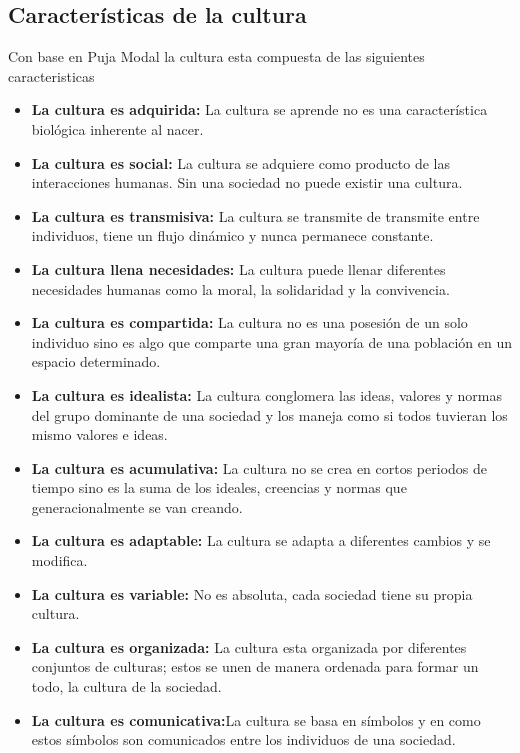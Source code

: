 	\subsection{Características de la cultura}\label{CulturaCaract}
	Con base en Puja Modal la cultura esta compuesta de las siguientes 
	caracteristicas\cite{RefculturaCarac}
	\begin{itemize}
		\item \textbf{La cultura es adquirida:} La cultura se aprende no es una 
		característica biológica inherente al nacer. 
		\item \textbf{La cultura es social:} La cultura se adquiere como producto de 
		las interacciones humanas. Sin una sociedad no puede existir una cultura.
		\item \textbf{La cultura es transmisiva:} La cultura se transmite de transmite 
		entre individuos, tiene un flujo dinámico y nunca permanece constante.
		\item \textbf{La cultura llena necesidades:} La cultura puede llenar diferentes 
		necesidades humanas como la moral, la solidaridad y la convivencia.
		\item \textbf{La cultura es compartida:} La cultura no es una posesión de un solo 
		individuo sino es algo que comparte una gran mayoría de una población en un espacio 
		determinado.
		\item \textbf{La cultura es idealista:} La cultura conglomera las ideas, 
		valores y normas del grupo dominante de una sociedad y los maneja como si todos 
		tuvieran los mismo valores e ideas. 
		\item \textbf{La cultura es acumulativa:} La cultura no se crea en cortos periodos 
		de tiempo sino es la suma de los ideales, creencias y normas que generacionalmente 
		se van creando.
		\item \textbf{La cultura es adaptable:} La cultura se adapta a diferentes 
		cambios y se modifica.
		\item \textbf{La cultura es variable:} No es absoluta, cada sociedad tiene su 
		propia cultura.
		\item \textbf{La cultura es organizada:} La cultura esta organizada por 
		diferentes conjuntos de culturas; estos se unen de manera ordenada para formar 
		un todo, la cultura de la sociedad. 
		\item \textbf{La cultura es comunicativa:}La cultura se basa en símbolos y en 
		como estos símbolos son comunicados entre los individuos de una sociedad. 
	\end{itemize}
	
